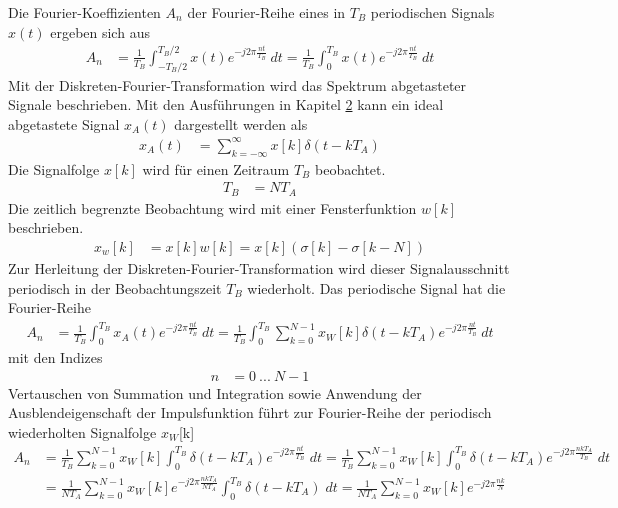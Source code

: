 Die Fourier-Koeffizienten \(A_{n}\) der Fourier-Reihe eines in \(T_{B}\) periodischen Signals \(x(t)\) ergeben sich aus
\begin{align}
A_{n} &= \frac{1}{T_{B}}  \int_{- T_{B}/2}^{T_{B}/2}{x(t)  e^{- j  2  \pi  \frac{n  t}{T_{B}}}\ dt} = \frac{1}{T_{B}}  \int_{0}^{T_{B}}{x(t)  e^{- j  2  \pi  \frac{n  t}{T_{B}}}\ dt} \label{eq:10.1}
\end{align}
Mit der Diskreten-Fourier-Transformation wird das Spektrum abgetasteter Signale beschrieben. Mit den Ausführungen in Kapitel \hyperref[signalabtastung-und-rekonstruktion]{2} kann ein ideal abgetastete Signal \(x_{A}(t)\) dargestellt werden als
\begin{align}
x_{A}(t) &= \sum\limits_{k = - \infty}^{\infty}{x[ k]  \delta\left( t - k  T_{A} \right)} \label{eq:10.2}
\end{align}
Die Signalfolge \(x[k]\) wird für einen Zeitraum \(T_{B}\) beobachtet.
\begin{align}
T_{B} &= N  T_{A} \label{eq:10.3}
\end{align}
Die zeitlich begrenzte Beobachtung wird mit einer Fensterfunktion \(w[k]\) beschrieben.
\begin{align}
x_{w}[ k] &= x[ k]  w[ k] = x[ k]  \left( \sigma[ k] - \sigma[ k - N] \right) \label{eq:10.4}
\end{align}
Zur Herleitung der Diskreten-Fourier-Transformation wird dieser Signalausschnitt periodisch in der Beobachtungszeit \(T_{B}\) wiederholt. Das periodische Signal hat die Fourier-Reihe
\begin{align}
A_{n} &= \frac{1}{T_{B}}  \int_{0}^{T_{B}}{x_{A}(t)  e^{- j  2  \pi  \frac{n  t}{T_{B}}}\ dt} = \frac{1}{T_{B}}  \int_{0}^{T_{B}}{\sum\limits_{k = 0}^{N - 1}{x_{W}[ k]  \delta\left( t - k  T_{A} \right)}  e^{- j  2  \pi  \frac{n  t}{T_{B}}}\ dt} \label{eq:10.5}
\end{align}
mit den Indizes
\begin{align}
n &= 0\ ...\ N - 1 \label{eq:10.6}
\end{align}
Vertauschen von Summation und Integration sowie Anwendung der Ausblendeigenschaft der Impulsfunktion führt zur Fourier-Reihe der periodisch wiederholten Signalfolge \(x_{W}\){[}k{]}
\begin{align}
{A_{n} } &=  {\frac{1}{T_{B} }  \sum\limits _{k=0}^{N-1}x_{W} \left[k\right] \int _{0}^{T_{B} }\delta \left(t-k T_{A} \right) e^{-j 2 \pi  \frac{n t}{T_{B} } } {\; }dt  =\frac{1}{T_{B} }  \sum\limits _{k=0}^{N-1}x_{W} \left[k\right] \int _{0}^{T_{B} }\delta \left(t-k T_{A} \right) e^{-j 2 \pi  \frac{n k T_{A} }{T_{B} } } {\; }dt  } \\
{} &=  {\frac{1}{N T_{A} }  \sum\limits _{k=0}^{N-1}x_{W} \left[k\right] e^{-j 2 \pi  \frac{n k T_{A} }{N T_{A} } }  \int _{0}^{T_{B} }\delta \left(t-k T_{A} \right){\; }dt  =\frac{1}{N T_{A} }  \sum\limits _{k=0}^{N-1}x_{W} \left[k\right] e^{-j 2 \pi  \frac{n k}{N} }  }
\label{eq:10.7}
\end{align}
